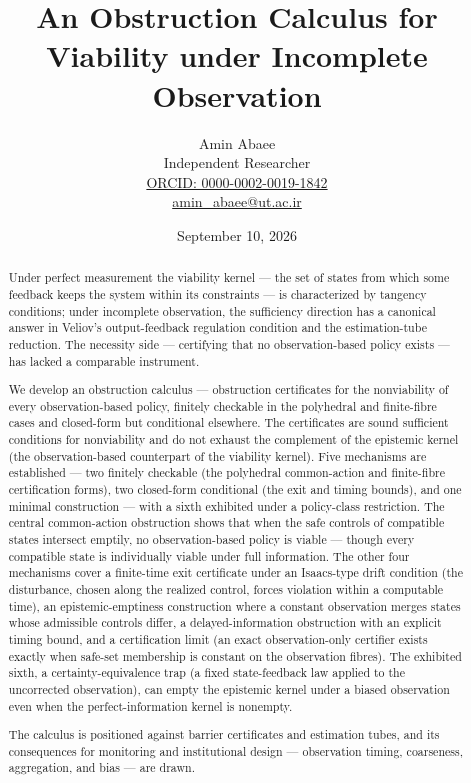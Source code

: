 \documentclass[11pt]{article}
\begin{document}
\title{An Obstruction Calculus for Viability under Incomplete Observation}
\author{Amin Abaee\\[0.35em]
{\small Independent Researcher}\\[0.55em]
{\small\href{https://orcid.org/0000-0002-0019-1842}{ORCID: 0000-0002-0019-1842}}\\[0.3em]
{\small\href{mailto:amin\_abaee@ut.ac.ir}{amin\_abaee@ut.ac.ir}}}
\date{September 10, 2026}
\maketitle

\begin{abstract}


Under perfect measurement the viability kernel --- the set of states
from which some feedback keeps the system within its constraints --- is
characterized by tangency conditions; under incomplete observation, the
sufficiency direction has a canonical answer in Veliov's output-feedback
regulation condition and the estimation-tube reduction. The necessity
side --- certifying that no observation-based policy exists --- has
lacked a comparable instrument.

We develop an obstruction calculus --- obstruction certificates for the
nonviability of every observation-based policy, finitely checkable in
the polyhedral and finite-fibre cases and closed-form but conditional
elsewhere. The certificates are sound sufficient conditions for
nonviability and do not exhaust the complement of the epistemic kernel
(the observation-based counterpart of the viability kernel). Five
mechanisms are established --- two finitely checkable (the polyhedral
common-action and finite-fibre certification forms), two closed-form
conditional (the exit and timing bounds), and one minimal construction
--- with a sixth exhibited under a policy-class restriction. The central
common-action obstruction shows that when the safe controls of
compatible states intersect emptily, no observation-based policy is
viable --- though every compatible state is individually viable under
full information. The other four mechanisms cover a finite-time exit certificate under an Isaacs-type drift condition (the disturbance,
chosen along the realized control, forces violation within a computable
time), an epistemic-emptiness construction where a constant observation
merges states whose admissible controls differ, a delayed-information
obstruction with an explicit timing bound, and a certification limit (an
exact observation-only certifier exists exactly when safe-set membership
is constant on the observation fibres). The exhibited sixth, a
certainty-equivalence trap (a fixed state-feedback law applied to the
uncorrected observation), can empty the epistemic kernel under a biased
observation even when the perfect-information kernel is nonempty.

The calculus is positioned against barrier certificates and estimation
tubes, and its consequences for monitoring and institutional design --- observation timing, coarseness, aggregation, and bias --- are drawn.

\end{abstract}
\end{document}
